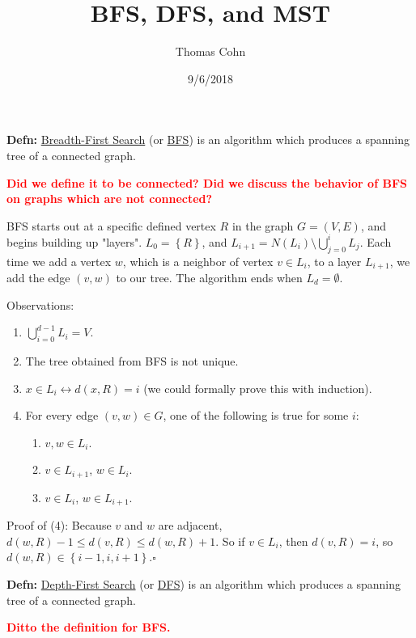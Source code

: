\documentclass[10pt,letterpaper]{article}
\author{Thomas Cohn}
\title{BFS, DFS, and MST}
\date{9/6/2018} %
\newcommand{\n}{\hfill\break}
\newcommand{\defn}[1]{\par\noindent\settowidth{\hangindent}{\textbf{Defn: }}\textbf{Defn: }#1\n}
\newcommand{\proven}{\;$\square$\n}
\newcommand{\set}[1]{\left\{#1\right\}}
\newcommand{\flag}[1]{\textbf{\textcolor{red}{#1}}}
\begin{document}
\maketitle
\setlength\RaggedRightParindent{\parindent}
\RaggedRight

\defn{\underline{Breadth-First Search} (or \underline{BFS}) is an algorithm which produces a spanning tree of a connected graph.}

\par\noindent\flag{Did we define it to be connected? Did we discuss the behavior of BFS on graphs which are not connected?}\n

\par\noindent BFS starts out at a specific defined vertex $R$ in the graph $G=(V,E)$, and begins building up "layers". $L_{0}=\set{R}$, and $L_{i+1}=N(L_{i})\setminus\bigcup_{j=0}^{i}L_{j}$. Each time we add a vertex $w$, which is a neighbor of vertex $v\in{}L_{i}$, to a layer $L_{i+1}$, we add the edge $(v,w)$ to our tree. The algorithm ends when $L_{d}=\emptyset$.\n

\par\noindent Observations:
\begin{enumerate}
	\item $\bigcup_{i=0}^{d-1}L_{i}=V$.
	\item The tree obtained from BFS is not unique.
	\item $x\in{}L_{i}\leftrightarrow{}d(x,R)=i$ (we could formally prove this with induction).
	\item For every edge $(v,w)\in{}G$, one of the following is true for some $i$:
		\begin{enumerate}
			\item $v,w\in{}L_{i}$.
			\item $v\in{}L_{i+1}$, $w\in{}L_{i}$.
			\item $v\in{}L_{i}$, $w\in{}L_{i+1}$.
		\end{enumerate}
\end{enumerate}

\par\noindent Proof of (4):\n
Because $v$ and $w$ are adjacent, $d(w,R)-1\le{}d(v,R)\le{}d(w,R)+1$.\n
So if $v\in{}L_{i}$, then $d(v,R)=i$, so $d(w,R)\in\set{i-1,i,i+1}$.\proven

\defn{\underline{Depth-First Search} (or \underline{DFS}) is an algorithm which produces a spanning tree of a connected graph.}

\par\noindent\flag{Ditto the definition for BFS.}\n
\end{document}
